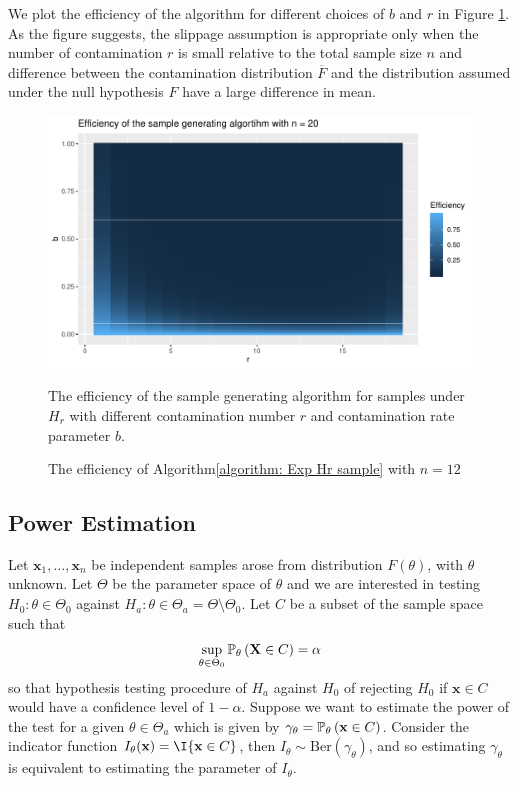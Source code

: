 \documentclass{report}
\begin{document}
We plot the efficiency of the algorithm for different choices of $b$ and $r$ in Figure \ref{Figure: efficiency}. As the figure suggests, the
slippage assumption is appropriate only when the number of contamination $r$ is small relative to the total sample size $n$ and difference between the
contamination distribution $\overline F$ and the distribution assumed under the null hypothesis $F$ have a large difference in mean.

\begin{figure}[hbtp]
    {\centering
    \includegraphics[scale = 0.6]{plot_eff.pdf}
    \caption{The efficiency of Algorithm\ref{algorithm: Exp Hr sample} with $n =12$}\label{Figure: efficiency}}
    {
     The efficiency of the sample generating algorithm for samples under $H_r$ with different
     contamination number $r$ and contamination rate parameter $b$. 
    }
\end{figure}

\subsection{Power Estimation} \label{sec:power est}

Let $\mathbf x_1,\ldots, \mathbf x_n$ be independent samples arose from distribution $F(\theta)$, with $\theta$ unknown. Let $\Theta$ be the parameter space
of $\theta$ and we are interested in testing $H_0 : \theta \in \Theta_0$ against $H_a: \theta \in \Theta_a = \Theta \setminus \Theta_0$. Let $C$ be a subset of the
sample space such that
\[ 
    \sup_{\theta \in \Theta_0} \P[\theta]{\mathbf X \in C} = \alpha
\]
so that hypothesis testing procedure of $H_a$ against $H_0$ of rejecting $H_0$ if $\mathbf x \in C$ would have a confidence level of $1 -\alpha$. Suppose we want to
 estimate the power of the test for a given $\theta \in \Theta_a$ which is given by $\gamma_\theta  = \P[\theta]{\mathbf x \in C}$. Consider the indicator function
 $I_\theta (\mathbf x) = \I{\mathbf x \in C}$, then $I_\theta \sim \mathrm{Ber}(\gamma_\theta)$, and so estimating $\gamma_\theta$ is equivalent to estimating the parameter of
 $I_\theta$.
\end{document}
